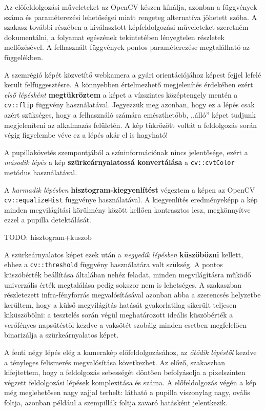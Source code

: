 Az előfeldolgozási műveleteket az OpenCV készen kínálja, azonban a függvények száma és paraméterezési lehetőségei miatt rengeteg alternatíva jöhetett szóba. A szakasz további részében a kiválasztott képfeldolgozási műveleteket szeretném dokumentálni, a folyamat egészének tekintetében lényegtelen részletek mellőzésével. A felhasznált függvények pontos paraméterezése megtalálható az  függelékben.

\bigskip

A szemrégió képét közvetítő webkamera a gyári orientációjához képest fejjel lefelé került felfüggesztésre. A könnyebben értelmezhető megjelenítés érdekében ezért \emph{első lépésként} \textbf{megtükröztem} a képet a vízszintes középtengely mentén a \texttt{cv::flip} függvény használatával. Jegyezzük meg azonban, hogy ez a lépés csak azért szükséges, hogy a felhasználó számára emészthetőbb, ,,álló'' képet tudjunk megjeleníteni az alkalmazás felületén. A kép tükrözött voltát a feldolgozás során végig figyelembe véve ez a lépés akár el is hagyható!

A pupillakövetés szempontjából a színinformációnak nincs jelentősége, ezért a \emph{második lépés} a kép \textbf{szürkeárnyalatossá konvertálása} a \texttt{cv::cvtColor} metódus használatával.

A \emph{harmadik lépésben} \textbf{hisztogram-kiegyenlítést} végeztem a képen az OpenCV \texttt{cv::equalizeHist} függvénye használatával. A kiegyenlítés eredményeképp a kép minden megvilágítási körülmény között kellően kontrasztos lesz, megkönnyítve ezzel a pupilla detektálását.

TODO: hisztogram+kuszob

A szürkeárnyalatos képet ezek után a \emph{negyedik lépésben} \textbf{küszöbözni} kellett, ehhez a \texttt{cv::threshold} függvény használatára volt szükség. A pontos küszöbérték beállítása általában nehéz feladat, minden megvilágításra működő univerzális érték megtalálása pedig sokszor nem is lehetséges. A  szakaszban részletezett infra-fényforrás megvalósításával azonban abba a szerencsés helyzetbe kerültem, hogy a külső megvilágítás hatását gyakorlatilag sikerült teljesen kiküszöbölni: a tesztelés során végül meghatározott ideális küszöbérték a verőfényes napsütéstől kezdve a vaksötét szobáig minden esetben megfelelően binarizálja a szürkeárnyalatos képet.

\bigskip

A fenti négy lépés elég a kamerakép előfeldolgozásához, az \emph{ötödik lépéstől} kezdve a tényleges felismerés megvalósítása következhet. Az előző,  szakaszban kifejtettem, hogy a feldolgozás sebességét döntően befolyásolja a pixelszinten végzett feldolgozási lépések komplexitása és száma. A előfeldolgozás végén a kép még meglehetősen nagy zajjal terhelt: látható a pupilla viszonylag nagy, ovális foltja, azonban például a szempillák foltja zavaró hatásként jelentkezik.

